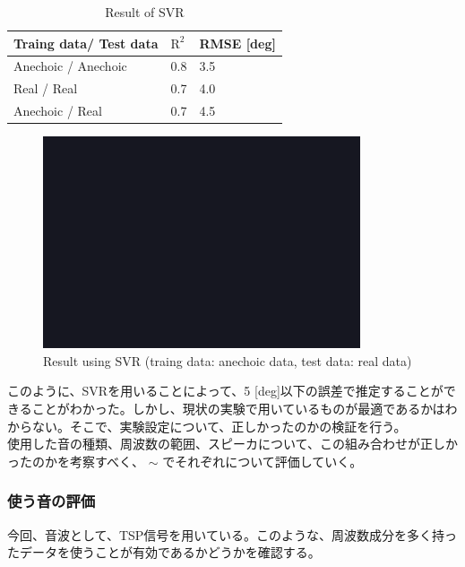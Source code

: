 \begin{table}[tb]
\caption{Result of SVR}    
\vspace{1zh}
\centering
  \begin{tabular}{|l|p{6em}|p{6em}|} \hline
    Traing data/ Test data & $\mathrm{R}^2$ & RMSE [deg] \\ \hline\hline 
    Anechoic / Anechoic & 0.8 &  3.5 \\ \hline 
    Real / Real & 0.7 &  4.0 \\ \hline
    Anechoic / Real & 0.7 &  4.5 \\ \hline
  \end{tabular}
  \label{tab:result_svr_r2_rmse}
\end{table}

\clearpage

\begin{figure}[tb]
  \begin{center}
  \vspace{1zh}
    \includegraphics[width=0.7\linewidth]{images/fig_sample.png}   
  \end{center}
  \caption{Result using SVR (traing data: anechoic data, test data: real data)}
  \label{fig:result_svr_2}
\end{figure}


このように、SVRを用いることによって、5 [deg]以下の誤差で推定することができることがわかった。しかし、現状の実験で用いているものが最適であるかはわからない。そこで、実験設定について、正しかったのかの検証を行う。\\
使用した音の種類、周波数の範囲、スピーカについて、この組み合わせが正しかったのかを考察すべく、 $\sim$ でそれぞれについて評価していく。

\subsubsection{使う音の評価}
\label{sec:result_svr_sound_kind}
今回、音波として、TSP信号を用いている。このような、周波数成分を多く持ったデータを使うことが有効であるかどうかを確認する。

